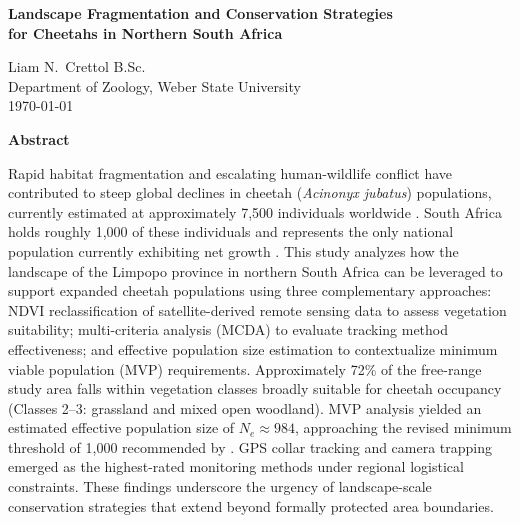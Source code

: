 \documentclass[12pt, letterpaper]{article}
\begin{document}
\thispagestyle{firstpage}

\begin{center}
\vspace*{0.5in}

{\large\bfseries
  Landscape Fragmentation and Conservation Strategies\\[4pt]
  for Cheetahs in Northern South Africa
}

\vspace{0.22in}

{\normalsize Liam N.\ Crettol B.Sc.}\\[3pt]
{\normalsize Department of Zoology, Weber State University}\\[3pt]
{\normalsize \today}

\end{center}

\vspace{0.3in}

\begin{center}{\normalsize\bfseries Abstract}\end{center}

\noindent
Rapid habitat fragmentation and escalating human-wildlife conflict have contributed to steep
global declines in cheetah (\textit{Acinonyx jubatus}) populations, currently estimated at
approximately 7,500 individuals worldwide \citep{Weise2015}. South Africa holds roughly
1,000 of these individuals and represents the only national population currently exhibiting net
growth \citep{Marnewick2014}. This study analyzes how the landscape of the Limpopo province
in northern South Africa can be leveraged to support expanded cheetah populations using three
complementary approaches: NDVI reclassification of satellite-derived remote sensing data to
assess vegetation suitability; multi-criteria analysis (MCDA) to evaluate tracking method
effectiveness; and effective population size estimation to contextualize minimum viable
population (MVP) requirements. Approximately 72\% of the free-range study area falls within
vegetation classes broadly suitable for cheetah occupancy (Classes 2--3: grassland and mixed
open woodland). MVP analysis yielded an estimated effective population size of
$N_e \approx 984$, approaching the revised minimum threshold of 1,000 recommended by
\citet{Frankham2014}. GPS collar tracking and camera trapping emerged as the highest-rated
monitoring methods under regional logistical constraints. These findings underscore the urgency
of landscape-scale conservation strategies that extend beyond formally protected area boundaries.
\end{document}
